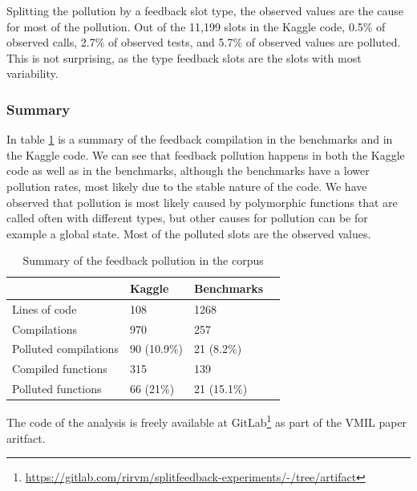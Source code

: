 Splitting the pollution by a feedback slot type, the observed values are the cause for most of the pollution. Out of the 11,199 slots in the Kaggle code, 0.5\% of observed calls, 2.7\% of observed tests, and 5.7\% of observed values are polluted. This is not surprising, as the type feedback slots are the slots with most variability.

\subsubsection*{Summary}

In table \ref{tbl:pollution-summary} is a summary of the feedback compilation in the benchmarks and in the Kaggle code. We can see that feedback pollution happens in both the Kaggle code as well as in the benchmarks, although the benchmarks have a lower pollution rates, most likely due to the stable nature of the code. We have observed that pollution is most likely caused by polymorphic functions that are called often with different types, but other causes for pollution can be for example a global state. Most of the polluted slots are the observed values.

\begin{table}[H]
	\centering
	\begin{tabular}{llll}
		\hline
		                      & Kaggle      & Benchmarks  \\
		\hline
		Lines of code         & 108         & 1268        \\
		Compilations          & 970         & 257         \\
		Polluted compilations & 90 (10.9\%) & 21 (8.2\%)  \\
		Compiled functions    & 315         & 139         \\
		Polluted functions    & 66 (21\%)   & 21 (15.1\%) \\
		\hline
	\end{tabular}
  \caption{Summary of the feedback pollution in the corpus\cite{feedback-vmil}}\label{tbl:pollution-summary}
\end{table}

The code of the analysis is freely available at GitLab\footnote{\url{https://gitlab.com/rirvm/splitfeedback-experiments/-/tree/artifact}} as part of the VMIL paper\cite{feedback-vmil} aritfact.

